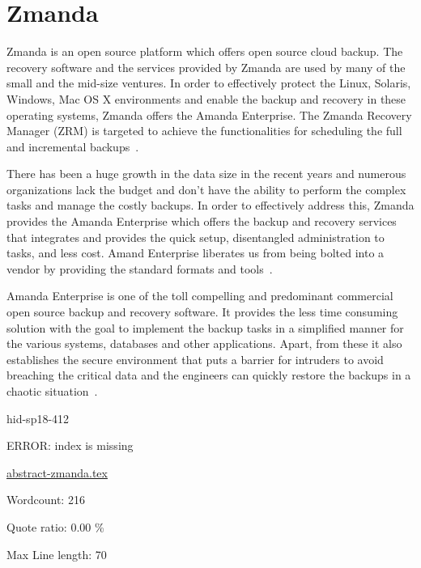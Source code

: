 \section{Zmanda}
Zmanda is an open source platform which offers open source cloud
backup.  The recovery software and the services provided by Zmanda are
used by many of the small and the mid-size ventures. In order to
effectively protect the Linux, Solaris, Windows, Mac OS X environments
and enable the backup and recovery in these operating systems, Zmanda
offers the Amanda Enterprise. The Zmanda Recovery Manager (ZRM) is
targeted to achieve the functionalities for scheduling the full and
incremental backups~\cite{hid-sp18-412-zmanda_crunchbase}.

There has been a huge growth in the data size in the recent years and
numerous organizations lack the budget and don't have the ability to
perform the complex tasks and manage the costly backups. In order to
effectively address this, Zmanda provides the Amanda Enterprise which
offers the backup and recovery services that integrates and provides
the quick setup, disentangled administration to tasks, and less
cost. Amand Enterprise liberates us from being bolted into a vendor by
providing the standard formats and
tools~\cite{hid-sp18-412-zmanda_amanda}.


Amanda Enterprise is one of the toll compelling and predominant
commercial open source backup and recovery software. It provides the
less time consuming solution with the goal to implement the backup
tasks in a simplified manner for the various systems, databases and
other applications. Apart, from these it also establishes the secure
environment that puts a barrier for intruders to avoid breaching the
critical data and the engineers can quickly restore the backups in a
chaotic situation~\cite{hid-sp18-412-zmanda_webinar}.



\begin{IU}

hid-sp18-412

ERROR: index is missing

\href{https://github.com/cloudmesh-community/hid-sp18-412/blob/master//technology/abstract-zmanda.tex}{abstract-zmanda.tex}

 

Wordcount: 216


Quote ratio: 0.00 \%
 
Max Line length: 70
\end{IU}


